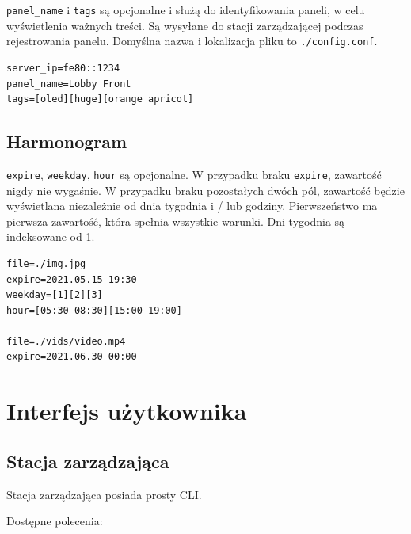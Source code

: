 \documentclass[12pt, a4paper]{article}
\begin{document}
\texttt{panel\_name} i \texttt{tags} są opcjonalne i służą do
identyfikowania paneli, w celu wyświetlenia ważnych treści. Są wysyłane
do stacji zarządzającej podczas rejestrowania panelu. Domyślna nazwa i
lokalizacja pliku to \texttt{./config.conf}.

\begin{verbatim}
server_ip=fe80::1234
panel_name=Lobby Front
tags=[oled][huge][orange apricot]
\end{verbatim}

\hypertarget{harmonogram}{%
\subsection{Harmonogram}\label{harmonogram}}

\texttt{expire}, \texttt{weekday}, \texttt{hour} są opcjonalne. W
przypadku braku \texttt{expire}, zawartość nigdy nie wygaśnie. W
przypadku braku pozostałych dwóch pól, zawartość będzie wyświetlana
niezależnie od dnia tygodnia i / lub godziny. Pierwszeństwo ma pierwsza
zawartość, która spełnia wszystkie warunki. Dni tygodnia są indeksowane od 1.

\begin{verbatim}
file=./img.jpg
expire=2021.05.15 19:30
weekday=[1][2][3]
hour=[05:30-08:30][15:00-19:00]
---
file=./vids/video.mp4
expire=2021.06.30 00:00
\end{verbatim}

\hypertarget{interfejs-uux17cytkownika}{%
\section{Interfejs użytkownika}\label{interfejs-uux17cytkownika}}

\hypertarget{stacja-zarzux105dzajux105ca}{%
\subsection{Stacja zarządzająca}\label{stacja-zarzux105dzajux105ca}}

Stacja zarządzająca posiada prosty CLI.

Dostępne polecenia: 
\end{document}
